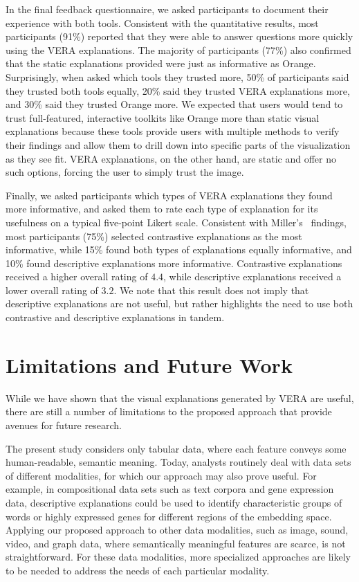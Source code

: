 \documentclass[lettersize,journal]{IEEEtran}
\begin{document}
In the final feedback questionnaire, we asked participants to document their experience with both tools. Consistent with the quantitative results, most participants (91\%) reported that they were able to answer questions more quickly using the VERA explanations. The majority of participants (77\%) also confirmed that the static explanations provided were just as informative as Orange.
Surprisingly, when asked which tools they trusted more, 50\% of participants said they trusted both tools equally, 20\% said they trusted VERA explanations more, and 30\% said they trusted Orange more. 
We expected that users would tend to trust full-featured, interactive toolkits like Orange more than static visual explanations because these tools provide users with multiple methods to verify their findings and allow them to drill down into specific parts of the visualization as they see fit. VERA explanations, on the other hand, are static and offer no such options, forcing the user to simply trust the image.

Finally, we asked participants which types of VERA explanations they found more informative, and asked them to rate each type of explanation for its usefulness on a typical five-point Likert scale. Consistent with Miller's~\cite{Miller2019} findings, most participants (75\%) selected contrastive explanations as the most informative, while 15\% found both types of explanations equally informative, and 10\% found descriptive explanations more informative.
Contrastive explanations received a higher overall rating of $4.4$, while descriptive explanations received a lower overall rating of $3.2$.
We note that this result does not imply that descriptive explanations are not useful, but rather highlights the need to use both contrastive and descriptive explanations in tandem.


\section{Limitations and Future Work}

While we have shown that the visual explanations generated by VERA are useful, there are still a number of limitations to the proposed approach that provide avenues for future research.

The present study considers only tabular data, where each feature conveys some human-readable, semantic meaning. Today, analysts routinely deal with data sets of different modalities, for which our approach may also prove useful.
For example, in compositional data sets such as text corpora and gene expression data, descriptive explanations could be used to identify characteristic groups of words or highly expressed genes for different regions of the embedding space.
Applying our proposed approach to other data modalities, such as image, sound, video, and graph data, where semantically meaningful features are scarce, is not straightforward. For these data modalities, more specialized approaches are likely to be needed to address the needs of each particular modality.
\end{document}
